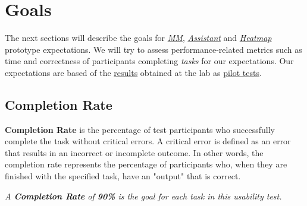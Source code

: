 
\section{Goals}
\label{sec:sec009}

The next sections will describe the goals for {\it \hyperlink{https://github.com/mida-project/prototype-multi-modality}{\gls{MM}}}, {\it \hyperlink{https://github.com/mida-project/prototype-multi-modality-assistant}{Assistant}} and {\it \hyperlink{https://github.com/mida-project/prototype-heatmap}{Heatmap}} prototype expectations. We will try to assess performance-related metrics such as time and correctness of participants completing \textit{tasks} for our expectations. Our expectations are based of the \hyperlink{https://docs.google.com/spreadsheets/d/1WwbvDO5Iz39Jr6H2ZzPth1o9DqhmpQz10Vtao7rvjfQ/edit?usp=sharing}{results} obtained at the lab as \hyperlink{https://www.nngroup.com/articles/pilot-testing/}{pilot tests}.


\subsection{Completion Rate}

\textbf{Completion Rate} is the percentage of test participants who successfully complete the task without critical errors. A critical error is defined as an error that results in an incorrect or incomplete outcome. In other words, the completion rate represents the percentage of participants who, when they are finished with the specified task, have an "output" that is correct.


\hfill

\textit{A \textbf{Completion Rate} of \textbf{90\%} is the goal for each task in this usability test.}

\hfill


